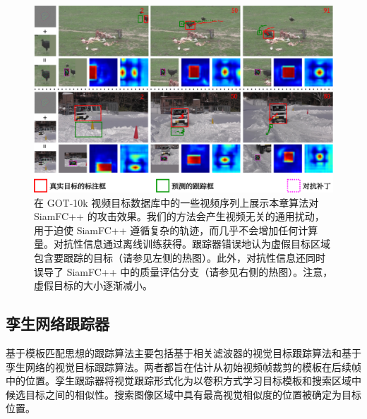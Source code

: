 \begin{figure}[t]
\centering
\includegraphics[width=1.0\textwidth]{Img/attack/1_v8.pdf}
\caption{在 GOT-10k 视频目标数据库中的一些视频序列上展示本章算法对 SiamFC++ 的攻击效果。我们的方法会产生视频无关的通用扰动，用于迫使 SiamFC++ 遵循复杂的轨迹，而几乎不会增加任何计算量。对抗性信息通过离线训练获得。跟踪器错误地认为虚假目标区域包含要跟踪的目标（请参见左侧的热图）。此外，对抗性信息还同时误导了 SiamFC++ 中的质量评估分支（请参见右侧的热图）。注意，虚假目标的大小逐渐减小。} 
\label{fig:1}
\end{figure}

\subsection{孪生网络跟踪器}

基于模板匹配思想的跟踪算法主要包括基于相关滤波器的视觉目标跟踪算法和基于孪生网络的视觉目标跟踪算法。两者都旨在估计从初始视频帧裁剪的模板在后续帧中的位置。孪生跟踪器将视觉跟踪形式化为以卷积方式学习目标模板和搜索区域中候选目标之间的相似性。搜索图像区域中具有最高视觉相似度的位置被确定为目标位置。

